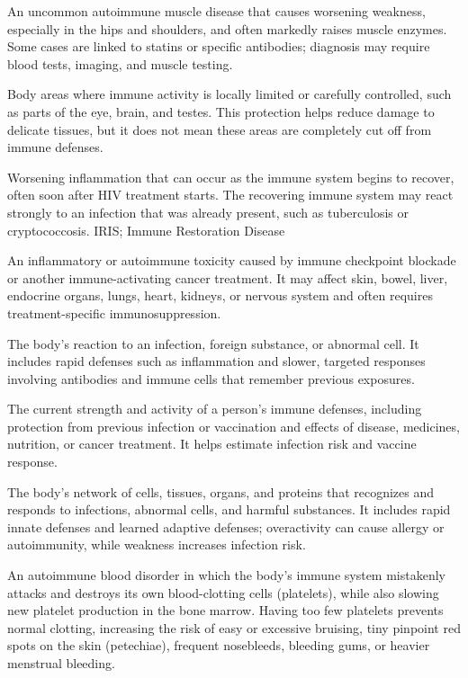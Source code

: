  An uncommon autoimmune muscle disease that causes worsening weakness, especially in the hips and shoulders, and often markedly raises muscle enzymes. Some cases are linked to statins or specific antibodies; diagnosis may require blood tests, imaging, and muscle testing.

 Body areas where immune activity is locally limited or carefully controlled, such as parts of the eye, brain, and testes. This protection helps reduce damage to delicate tissues, but it does not mean these areas are completely cut off from immune defenses.

 Worsening inflammation that can occur as the immune system begins to recover, often soon after HIV treatment starts. The recovering immune system may react strongly to an infection that was already present, such as tuberculosis or cryptococcosis.
\synonyms
IRIS; Immune Restoration Disease

 An inflammatory or autoimmune toxicity caused by immune checkpoint blockade or another
immune-activating cancer treatment. It may affect skin, bowel, liver, endocrine organs,
lungs, heart, kidneys, or nervous system and often requires treatment-specific
immunosuppression.

 The body’s reaction to an infection, foreign substance, or abnormal cell. It includes rapid defenses such as inflammation and slower, targeted responses involving antibodies and immune cells that remember previous exposures.

 The current strength and activity of a person’s immune defenses, including protection from previous infection or vaccination and effects of disease, medicines, nutrition, or cancer treatment. It helps estimate infection risk and vaccine response.

 The body's network of cells, tissues, organs, and proteins that recognizes and responds to infections, abnormal cells, and harmful substances. It includes rapid innate defenses and learned adaptive defenses; overactivity can cause allergy or autoimmunity, while weakness increases infection risk.

 An autoimmune blood disorder in which the body's immune system mistakenly attacks and destroys its own blood-clotting cells (platelets), while also slowing new platelet production in the bone marrow. Having too few platelets prevents normal clotting, increasing the risk of easy or excessive bruising, tiny pinpoint red spots on the skin (petechiae), frequent nosebleeds, bleeding gums, or heavier menstrual bleeding.

